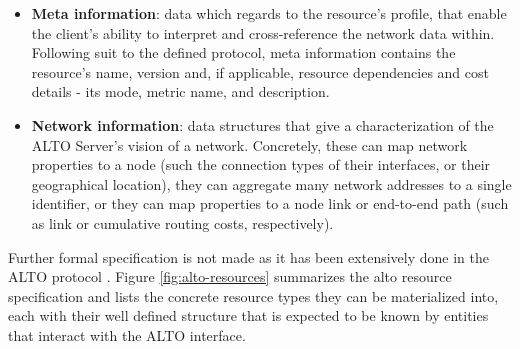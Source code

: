 \begin{itemize}
        \item \textbf{Meta information}: data which regards to the resource's profile, that enable the client's ability to interpret and cross-reference the network data within. Following suit to the defined protocol, meta information contains the resource's name, version and, if applicable, resource dependencies and cost details - its mode, metric name, and description.
        \item \textbf{Network information}: data structures that give a characterization of the ALTO Server's vision of a network. Concretely, these can map network properties to a node (such the connection types of their interfaces, or their geographical location), they can aggregate many network addresses to a single identifier, or they can map properties to a node link or end-to-end path (such as link or cumulative routing costs, respectively).
\end{itemize}{}


Further formal specification is not made as it has been extensively done in the ALTO protocol \cite{alto-protocol}. Figure \ref{fig:alto-resources} summarizes the alto resource specification and lists the concrete resource types they can be materialized into, each with their well defined structure that is expected to be known by entities that interact with the ALTO interface.


